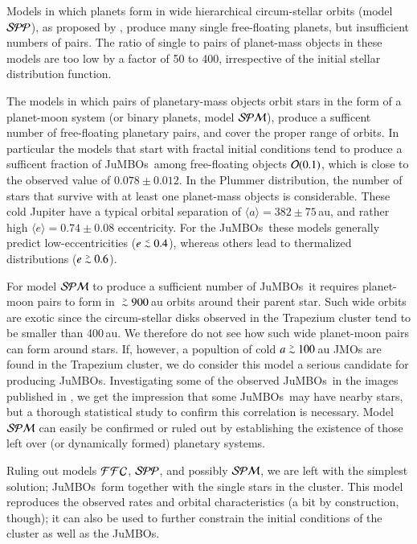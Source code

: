 \documentclass[submission,phys]{lib/SciPost}
\def\apgt{\ {\raise-.5ex\hbox{$\buildrel>\over\sim$}}\ }
\def\aplt{\ {\raise-.5ex\hbox{$\buildrel<\over\sim$}}\ }
\newcommand{\jumbos}{\mbox{JuMBOs}}
\begin{document}
Models in which planets form in wide hierarchical circum-stellar
orbits (model ${\cal SPP}$), as proposed by
\cite{2023arXiv231006016W}, produce many single free-floating planets,
but insufficient numbers of pairs. The ratio of single to pairs of
planet-mass objects in these models are too low by a factor of 50 to
400, irrespective of the initial stellar distribution function.

The models in which pairs of planetary-mass objects orbit stars in the
form of a planet-moon system (or binary planets, model ${\cal SPM}$),
produce a sufficent number of free-floating planetary pairs, and cover
the proper range of orbits.  In particular the models that start with
fractal initial conditions tend to produce a sufficent fraction of
\jumbos\, among free-floating objects ${\cal O}(0.1)$, which is close
to the observed value of $0.078\pm0.012$. In the Plummer distribution,
the number of stars that survive with at least one planet-mass objects
is considerable.  These cold Jupiter have a typical orbital separation
of $\langle a\rangle = 382\pm75$\,au, and rather high $\langle e \rangle
= 0.74\pm 0.08$ eccentricity.  For the \jumbos\, these models
generally predict low-eccentricities ($e\aplt 0.4$), whereas others
lead to thermalized distributions ($e\apgt 0.6$).

For model ${\cal SPM}$ to produce a sufficient number of \jumbos\, it
requires planet-moon pairs to form in $\apgt 900$\,au orbits around
their parent star. Such wide orbits are exotic since the
circum-stellar disks observed in the Trapezium cluster tend to be
smaller than 400\,au. We therefore do not see how such wide
planet-moon pairs can form around stars. If, however, a popultion of
cold $a\apgt 100$\,au JMOs are found in the Trapezium cluster, we do
consider this model a serious candidate for producing \jumbos.
Investigating some of the observed \jumbos\ in the images published in
\cite{2023arXiv231001231P}, we get the impression that some \jumbos\,
may have nearby stars, but a thorough statistical study to confirm
this correlation is necessary.  Model ${\cal SPM}$ can easily be
confirmed or ruled out by establishing the existence of those left
over (or dynamically formed) planetary systems.

Ruling out models ${\cal FFC}$, ${\cal SPP}$, and possibly ${\cal
  SPM}$, we are left with the simplest solution; \jumbos\, form
together with the single stars in the cluster.  This model reproduces
the observed rates and orbital characteristics (a bit by construction,
though); it can also be used to further constrain the initial
conditions of the cluster as well as the \jumbos.
\end{document}
